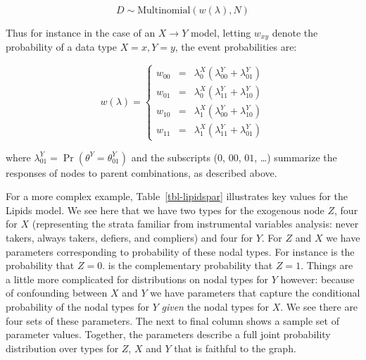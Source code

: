 \documentclass[
  11pt,
  article]{jss}
\renewcommand{\texttt}[1]{\code{#1}}
\begin{document}
\[
D \sim \text{Multinomial}(w(\lambda), N)
\]

Thus for instance in the case of an \(X \rightarrow Y\) model, letting
\(w_{xy}\) denote the probability of a data type \(X=x, Y=y\), the event
probabilities are:

\[
w(\lambda) = \left\{\begin{array}{ccc} w_{00} & = & \lambda^X_0(\lambda^Y_{00} + \lambda^Y_{01})\\
w_{01} & = & \lambda^X_0(\lambda^Y_{11} + \lambda^Y_{10})\\
w_{10} & = & \lambda^X_1(\lambda^Y_{00} + \lambda^Y_{10})\\
w_{11} & = & \lambda^X_1(\lambda^Y_{11} + \lambda^Y_{01})\end{array} \right.
\]

where \(\lambda^Y_{01}=\Pr(\theta^Y = \theta^Y_{01})\) and the
subscripts (\(0\), \(00\), \(01\), \dots) summarize the responses of
nodes to parent combinations, as described above.

For a more complex example, Table~\ref{tbl-lipidspar} illustrates key
values for the Lipids model. We see here that we have two types for the
exogenous node \(Z\), four for \(X\) (representing the strata familiar
from instrumental variables analysis: never takers, always takers,
defiers, and compliers) and four for \(Y\). For \(Z\) and \(X\) we have
parameters corresponding to probability of these nodal types. For
instance \texttt{Z.0} is the probability that \(Z=0\). \texttt{Z.1} is
the complementary probability that \(Z=1\). Things are a little more
complicated for distributions on nodal types for \(Y\) however: because
of confounding between \(X\) and \(Y\) we have parameters that capture
the conditional probability of the nodal types for \(Y\) \emph{given}
the nodal types for \(X\). We see there are four sets of these
parameters. The next to final column shows a sample set of parameter
values. Together, the parameters describe a full joint probability
distribution over types for \(Z\), \(X\) and \(Y\) that is faithful to
the graph.
\end{document}

